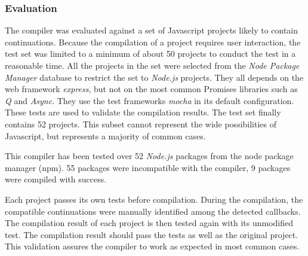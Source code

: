 \subsubsection{Evaluation} \label{chapter5:due:evaluation}




The compiler was evaluated against a set of Javascript projects likely to contain continuations.
Because the compilation of a project requires user interaction, the test set was limited to a minimum of about \num{50} projects to conduct the test in a reasonable time.
All the projects in the set were selected from the \textit{Node Package Manager} database to restrict the set to \textit{Node.js} projects.
They all depends on the web framework \textit{express}, but not on the most common Promises libraries such as \textit{Q} and \textit{Async}.
They use the test frameworks \textit{mocha} in its default configuration.
These tests are used to validate the compilation results.
The test set finally contains \num{52} projects.
This subset cannot represent the wide possibilities of Javascript, but represents a majority of common cases.



This compiler has been tested over \num{52} \textit{Node.js} packages from the node package manager (npm).
55 packages were incompatible with the compiler, 9 packages were compiled with success.



Each project passes its own tests before compilation.
During the compilation, the compatible continuations were manually identified among the detected callbacks.
The compilation result of each project is then tested again with its unmodified test.
The compilation result should pass the tests as well as the original project.
This validation assures the compiler to work as expected in most common cases.


